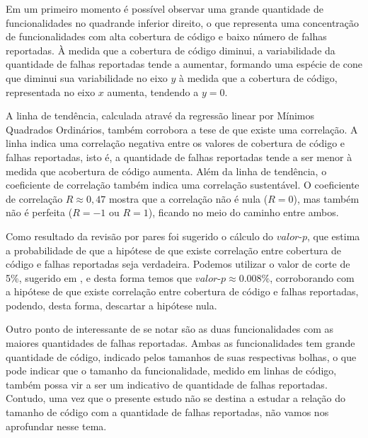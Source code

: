 \documentclass[11.5pt]{article}
\begin{document}
Em um primeiro momento é possível observar uma grande quantidade de funcionalidades no quadrande
inferior direito, o que representa uma concentração de funcionalidades com alta cobertura de código
e baixo número de falhas reportadas.
À medida que a cobertura de código diminui, a variabilidade da quantidade de falhas reportadas tende
a aumentar, formando uma espécie de cone que diminui sua variabilidade no eixo $y$ à medida que
a cobertura de código, representada no eixo $x$ aumenta, tendendo a $y = 0$.

A linha de tendência, calculada atravé da regressão linear por Mínimos Quadrados Ordinários,
também corrobora a tese de que existe uma correlação.
A linha indica uma correlação negativa entre os valores de cobertura de código e falhas reportadas,
isto é, a quantidade de falhas reportadas tende a ser menor à medida que acobertura de código
aumenta.
Além da linha de tendência, o coeficiente de correlação também indica uma correlação sustentável.
O coeficiente de correlação $R \approx 0,47$ mostra que a correlação não é nula ($R = 0$), mas
também não é perfeita ($R = -1$ ou $R = 1$), ficando no meio do caminho entre ambos.

Como resultado da revisão por pares foi sugerido o cálculo do $valor\mbox{-}p$, que estima a
probabilidade de que a hipótese de que existe correlação entre cobertura de código e falhas
reportadas seja verdadeira.
Podemos utilizar o valor de corte de 5\%, sugerido em \cite{openIntroStat}, e desta forma temos
que $valor\mbox{-}p \approx 0.008\%$, corroborando com a hipótese de que existe correlação entre cobertura
de código e falhas reportadas, podendo, desta forma, descartar a hipótese nula.

Outro ponto de interessante de se notar são as duas funcionalidades com as maiores quantidades de
falhas reportadas.
Ambas as funcionalidades tem grande quantidade de código, indicado pelos tamanhos de suas
respectivas bolhas, o que pode indicar que o tamanho da funcionalidade, medido em linhas de código,
também possa vir a ser um indicativo de quantidade de falhas reportadas.
Contudo, uma vez que o presente estudo não se destina a estudar a relação do tamanho de código com
a quantidade de falhas reportadas, não vamos nos aprofundar nesse tema.
\end{document}

